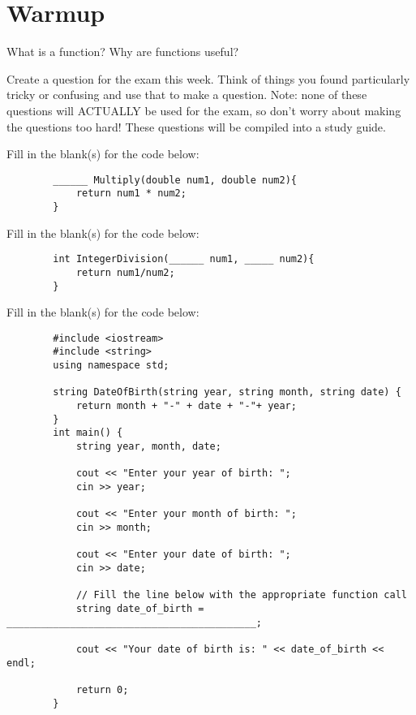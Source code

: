 \section{Warmup}
\begin{problem}
    What is a function? Why are functions useful? 
\end{problem}

\begin{problem}
    Create a question for the exam this week. Think of things you found particularly tricky or confusing and use that to make a question. Note: none of these questions will ACTUALLY be used for the exam, so don't worry about making the questions too hard! These questions will be compiled into a study guide.
\end{problem}

\begin{problem}
    Fill in the blank(s) for the code below:
    \begin{verbatim}
        ______ Multiply(double num1, double num2){
            return num1 * num2;
        }
    \end{verbatim}
\end{problem}
\begin{problem}
    Fill in the blank(s) for the code below:
    \begin{verbatim}
        int IntegerDivision(______ num1, _____ num2){
            return num1/num2;
        }
    \end{verbatim}
\end{problem}
\begin{problem}
    Fill in the blank(s) for the code below:
    \begin{verbatim}
        #include <iostream>
        #include <string>
        using namespace std;
        
        string DateOfBirth(string year, string month, string date) {
            return month + "-" + date + "-"+ year;
        }
        int main() {
            string year, month, date;
        
            cout << "Enter your year of birth: ";
            cin >> year;
        
            cout << "Enter your month of birth: ";
            cin >> month;
        
            cout << "Enter your date of birth: ";
            cin >> date;
        
            // Fill the line below with the appropriate function call
            string date_of_birth = ___________________________________________;
        
            cout << "Your date of birth is: " << date_of_birth << endl;
        
            return 0;
        }

    \end{verbatim}
\end{problem}
